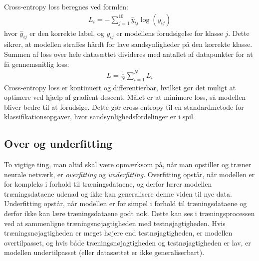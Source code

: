 \documentclass{article}
\begin{document}
Cross-entropy loss beregnes ved formlen:
\begin{align}
L_i = -\sum_{j=1}^{10} \hat{y}_{ij} \log(y_{ij})
\end{align}
hvor $ \hat{y}_{ij} $ er den korrekte label, og $ y_{ij} $ er modellens forudsigelse for klasse $ j $. Dette sikrer, at modellen straffes hårdt for lave sandsynligheder på den korrekte klasse. Summen af loss over hele datasættet divideres med antallet af datapunkter for at få gennemsnitlig loss:
\begin{align}
L = \frac{1}{N} \sum_{i=1}^{N} L_i
\end{align}
Cross-entropy loss er kontinuert og differentierbar, hvilket gør det muligt at optimere ved hjælp af gradient descent. Målet er at minimere loss, så modellen bliver bedre til at forudsige. Dette gør cross-entropy til en standardmetode for klassifikationsopgaver, hvor sandsynlighedsfordelinger er i spil. \parencite{Kumar_2024,verma2020neuralnet}
\subsection{Over og underfitting}
To vigtige ting, man altid skal være opmærksom på, når man opstiller og træner neurale netværk, er \textit{overfitting} og \textit{underfitting}. Overfitting opstår, når modellen er for kompleks i forhold til træningsdataene, og derfor lærer modellen træningsdataene udenad og ikke kan generalisere denne viden til nye data. Underfitting opstår, når modellen er for simpel i forhold til træningsdataene og derfor ikke kan lære træningsdataene godt nok. Dette kan ses i træningsprocessen ved at sammenligne træningsnøjagtigheden med testnøjagtigheden. Hvis træningsnøjagtigheden er meget højere end testnøjagtigheden, er modellen overtilpasset, og hvis både træningsnøjagtigheden og testnøjagtigheden er lav, er modellen undertilpasset (eller datasættet er ikke generaliserbart). \parencite{Kirsanov_2024,sanderson2017neural}
\end{document}
